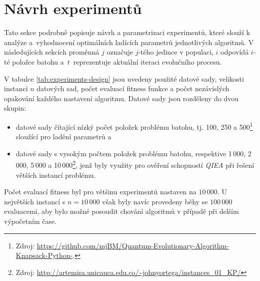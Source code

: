 \section{Návrh experimentů}\label{sec:experiments-design}
Tato sekce podrobně popisuje návrh a parametrizaci experimentů, které slouží k analýze a~vyhodnocení optimálních ladících parametrů jednotlivých algoritmů. 
V následujících sekcích proměnná $j$ označuje $j$-tého jedince v populaci, $i$ odpovídá $i$-té položce batohu a~$t$~reprezentuje aktuální iteraci evolučního procesu. 

V tabulce \ref{tab:experiments-design} jsou uvedeny použité datové sady, velikosti instancí $n$ datových sad, počet evaluací fitness funkce a počet nezávislých opakování každého nastavení algoritmu. 
Datové sady jsou rozděleny do dvou skupin:
\begin{itemize}
    \item datové sady čítající nízký počet položek problému batohu, tj. 100, 250 a 500\footnote{Zdroj: \url{https://github.com/mjBM/Quantum-Evolutionary-Algorithm-Knapsack-Python-}.} sloužící pro ladění parametrů a
    \item datové sady s vysokým počtem položek problému batohu, respektive 1\,000, 2\,000, 5\,000 a 10\,000\footnote{Zdroj: \url{http://artemisa.unicauca.edu.co/~johnyortega/instances_01_KP/}}, jenž byly využity pro ověření schopností \emph{QIEA} při řešení větších instancí problému. 
\end{itemize}
Počet evaluací fitness byl pro většinu experimentů nastaven na $10\,000$. 
U největších instancí s $n = 10\,000$ však byly navíc provedeny běhy se $100\,000$ evaluacemi, aby bylo možné posoudit chování algoritmů v případě při delším výpočetním čase. 

